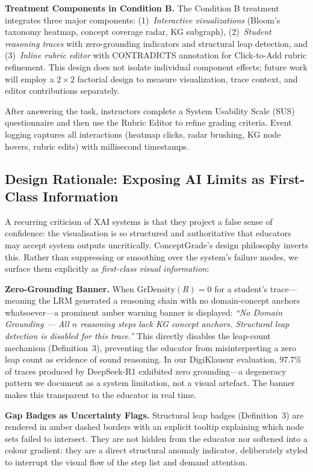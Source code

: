 \documentclass[journal,review]{vgtc}
\begin{document}
\textbf{Treatment Components in Condition B.} The Condition B treatment integrates three major components:
(1)~\textit{Interactive visualizations} (Bloom's taxonomy heatmap, concept coverage radar, KG subgraph),
(2)~\textit{Student reasoning traces} with zero-grounding indicators and structural leap detection, and
(3)~\textit{Inline rubric editor} with CONTRADICTS annotation for Click-to-Add rubric refinement.
This design does not isolate individual component effects; future work will employ a $2 \times 2$ factorial design to measure visualization, trace context, and editor contributions separately.

After answering the task, instructors complete a System Usability Scale (SUS) questionnaire and then use the Rubric Editor to refine grading criteria. Event logging captures all interactions (heatmap clicks, radar brushing, KG node hovers, rubric edits) with millisecond timestamps.

\subsection{Design Rationale: Exposing AI Limits as First-Class Information}

A recurring criticism of XAI systems is that they project a false sense of confidence: the visualisation is so structured and authoritative that educators may accept system outputs uncritically. ConceptGrade's design philosophy inverts this. Rather than suppressing or smoothing over the system's failure modes, we surface them explicitly as \textit{first-class visual information}:

\textbf{Zero-Grounding Banner.} When $\text{GrDensity}(R) = 0$ for a student's trace---meaning the LRM generated a reasoning chain with no domain-concept anchors whatsoever---a prominent amber warning banner is displayed: \textit{``No Domain Grounding --- All $n$ reasoning steps lack KG concept anchors. Structural leap detection is disabled for this trace.''} This directly disables the leap-count mechanism (Definition~3), preventing the educator from misinterpreting a zero leap count as evidence of sound reasoning. In our DigiKlausur evaluation, 97.7\% of traces produced by DeepSeek-R1 exhibited zero grounding---a degeneracy pattern we document as a system limitation, not a visual artefact. The banner makes this transparent to the educator in real time.

\textbf{Gap Badges as Uncertainty Flags.} Structural leap badges (Definition~3) are rendered in amber dashed borders with an explicit tooltip explaining which node sets failed to intersect. They are not hidden from the educator nor softened into a colour gradient: they are a direct structural anomaly indicator, deliberately styled to interrupt the visual flow of the step list and demand attention.
\end{document}
